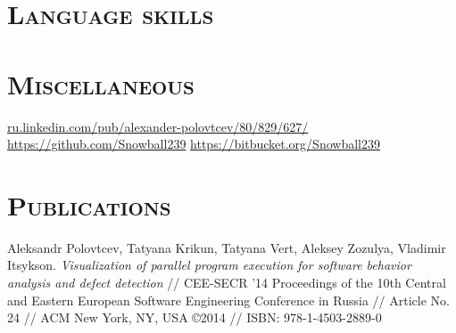 \documentclass[12pt,a4paper]{moderncv}
\begin{document}
\section{\textsc{Language skills}}
%


\section{\textsc{Miscellaneous}}
%
       {{\color{see}\url{ru.linkedin.com/pub/alexander-polovtcev/80/829/627/}}}
       {{\color{see}\url{https://github.com/Snowball239}}}
       {{\color{see}\url{https://bitbucket.org/Snowball239}}}


\section{\textsc{Publications}}
%
       {Aleksandr Polovtcev, Tatyana Krikun, Tatyana Vert, Aleksey Zozulya, Vladimir Itsykson.
\textit{Visualization of parallel program execution for software behavior analysis and defect detection}
        // CEE-SECR '14 Proceedings of the 10th Central and Eastern European Software Engineering Conference in Russia
        // Article No. 24
        // ACM New York, NY, USA ©2014
        // ISBN: 978-1-4503-2889-0
}
\end{document}
